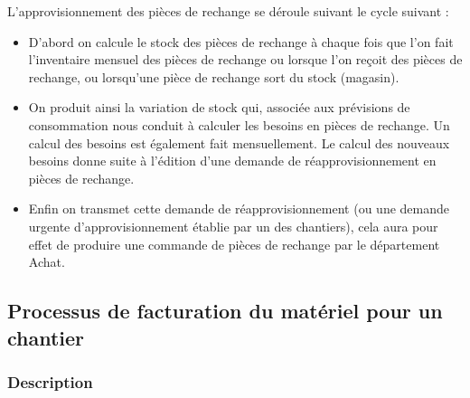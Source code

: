 						L'approvisionnement des pièces de rechange se déroule suivant le cycle suivant :
						\begin{itemize}
						    \item D'abord on calcule le stock des pièces de rechange à chaque fois que l'on fait l'inventaire mensuel des pièces de rechange ou lorsque l'on reçoit des pièces de rechange, ou lorsqu'une pièce de rechange sort du stock (magasin).
						    \item On produit ainsi la variation de stock qui, associée aux prévisions de consommation nous conduit à calculer les besoins en pièces de rechange. Un calcul des besoins est également fait mensuellement. Le calcul des nouveaux besoins donne suite à l'édition d'une demande de réapprovisionnement en pièces de rechange.
						    \item Enfin on transmet cette demande de réapprovisionnement (ou une demande urgente d'approvisionnement
établie par un des chantiers), cela aura pour effet de produire une commande de pièces de rechange par le département Achat.
						\end{itemize}
						
				
				
				
		\subsection{Processus de facturation du matériel pour un chantier}
				\subsubsection{Description}
				
